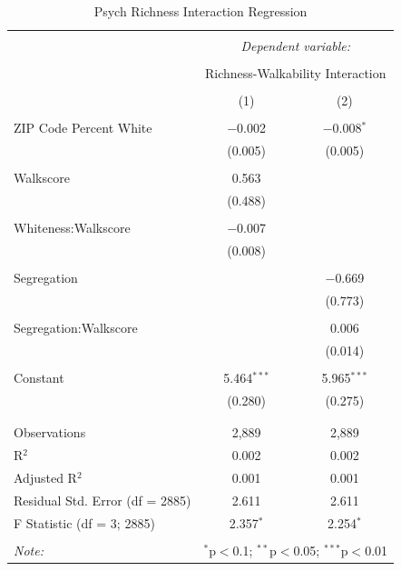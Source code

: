 \documentclass[
  man,floatsintext]{apa7}
\begin{document}
\begin{table}[!htbp] \centering 
  \caption{Psych Richness Interaction Regression} 
  \label{tab:rich-interaction-regression} 
\tiny 
\begin{tabular}{@{\extracolsep{1pt}}lcc} 
\\[-1.8ex]\hline 
\hline \\[-1.8ex] 
 & \multicolumn{2}{c}{\textit{Dependent variable:}} \\ 
\cline{2-3} 
\\[-1.8ex] & \multicolumn{2}{c}{Richness-Walkability Interaction} \\ 
\\[-1.8ex] & (1) & (2)\\ 
\hline \\[-1.8ex] 
 ZIP Code Percent White & $-$0.002 & $-$0.008$^{*}$ \\ 
  & (0.005) & (0.005) \\ 
  & & \\ 
 Walkscore & 0.563 &  \\ 
  & (0.488) &  \\ 
  & & \\ 
 Whiteness:Walkscore & $-$0.007 &  \\ 
  & (0.008) &  \\ 
  & & \\ 
 Segregation &  & $-$0.669 \\ 
  &  & (0.773) \\ 
  & & \\ 
 Segregation:Walkscore &  & 0.006 \\ 
  &  & (0.014) \\ 
  & & \\ 
 Constant & 5.464$^{***}$ & 5.965$^{***}$ \\ 
  & (0.280) & (0.275) \\ 
  & & \\ 
\hline \\[-1.8ex] 
Observations & 2,889 & 2,889 \\ 
R$^{2}$ & 0.002 & 0.002 \\ 
Adjusted R$^{2}$ & 0.001 & 0.001 \\ 
Residual Std. Error (df = 2885) & 2.611 & 2.611 \\ 
F Statistic (df = 3; 2885) & 2.357$^{*}$ & 2.254$^{*}$ \\ 
\hline 
\hline \\[-1.8ex] 
\textit{Note:}  & \multicolumn{2}{r}{$^{*}$p$<$0.1; $^{**}$p$<$0.05; $^{***}$p$<$0.01} \\ 
\end{tabular} 
\end{table}
\end{document}
